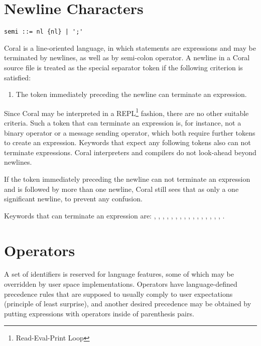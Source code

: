 \section{Newline Characters}\label{sec:newlinecharacters}

\syntax\begin{lstlisting}
semi ::= nl {nl} | ';'
\end{lstlisting}

Coral is a line-oriented language, in which statements are expressions and may be terminated by newlines, as well as by semi-colon operator. A newline in a Coral source file is treated as the special separator token \lstinline@nl@ if the following criterion is satisfied:

\begin{enumerate}
\item The token immediately preceding the newline can terminate an expression.
\end{enumerate}

Since Coral may be interpreted in a REPL\footnote{Read-Eval-Print Loop} fashion, there are no other suitable criteria. Such a token that can terminate an expression is, for instance, not a binary operator or a message sending operator, which both require further tokens to create an expression. Keywords that expect any following tokens also can not terminate expressions. Coral interpreters and compilers do not look-ahead beyond newlines.

If the token immediately preceding the newline can not terminate an expression and is followed by more than one newline, Coral still sees that as only a one significant newline, to prevent any confusion.

Keywords that can terminate an expression are: \lstinline@break@, \lstinline@end@, \lstinline@opaque@, \lstinline@native@, \lstinline@next@, \lstinline@nil@, \lstinline@no@, \lstinline@redo@, \lstinline@retry@, \lstinline@return@, \lstinline@self@, \lstinline@skip@, \lstinline@super@, \lstinline@this@, \lstinline@transparent@, \lstinline@yes@, \lstinline@yield@.

\section{Operators}\label{sec:operators}
A set of identifiers is reserved for language features, some of which may be overridden by user space implementations. Operators have language-defined precedence rules that are supposed to usually comply to user expectations (principle of least surprise), and another desired precedence may be obtained by putting expressions with operators inside of parenthesis pairs. 

